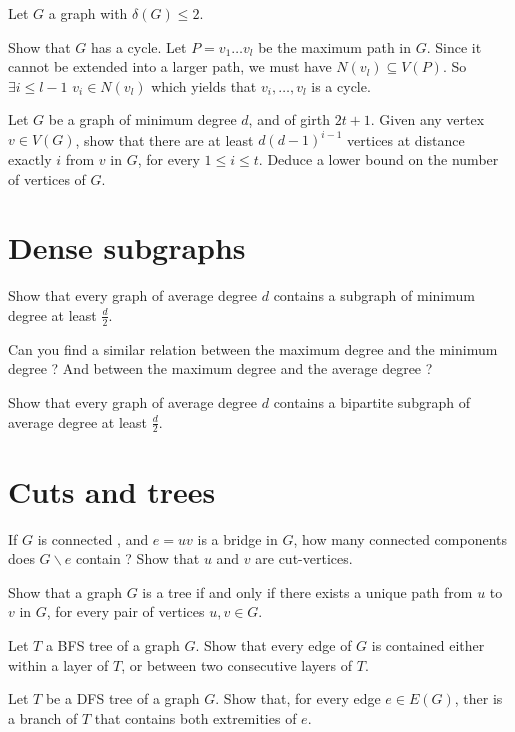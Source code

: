 \documentclass{article}
\theoremstyle{plain}
\begin{document}
  \begin{correction}{}{}
    Let $G$ a graph with $\delta(G) \leq 2$.

    Show that $G$ has a cycle. Let $P = v_1 \ldots v_l$ be the maximum path in
    $G$. Since it cannot be extended into a larger path, we must have $N(v_l)
    \subseteq V(P)$. So $\exists i \leq l-1$ $v_i \in N(v_l)$ which yields that
    $v_i, \ldots , v_l$ is a cycle.
  \end{correction}

  \exercice Let $G$ be a graph of minimum degree $d$, and of girth $2t+1$. Given
  any vertex $v \in V(G)$, show that there are at least $d(d-1)^{i-1}$ vertices
  at distance exactly $i$ from $v$ in $G$, for every $1 \leq i \leq t$. Deduce a
  lower bound on the number of vertices of $G$.

  \begin{correction}{}{}
  \end{correction}


  \section{Dense subgraphs}

  \exercice Show that every graph of average degree $d$ contains a subgraph of
  minimum degree at least $\frac d 2$.

  \begin{correction}{}{}
  \end{correction}

  \exercice Can you find a similar relation between the maximum degree and the
  minimum degree ? And between the maximum degree and the average degree ?

  \exercice Show that every graph of average degree $d$ contains a bipartite
  subgraph of average degree at least $\frac d 2$.

  \section{Cuts and trees}

  \exercice If $G$ is connected , and $e=uv$ is a bridge in $G$, how many
  connected components does $G\backslash e$ contain ? Show that $u$ and $v$ are
  cut-vertices.

  \exercice Show that a graph $G$ is a tree if and only if there exists a unique
  path from $u$ to $v$ in $G$, for every pair of vertices $u, v \in G$.

  \exercice Let $T$ a BFS tree of a graph $G$. Show that every edge of $G$ is
  contained either within a layer of $T$, or between two consecutive layers of
  $T$.

  \exercice Let $T$ be a DFS tree of a graph $G$. Show that, for every edge $e
  \in E(G)$, ther is a branch of $T$ that contains both extremities of $e$.
\end{document}
